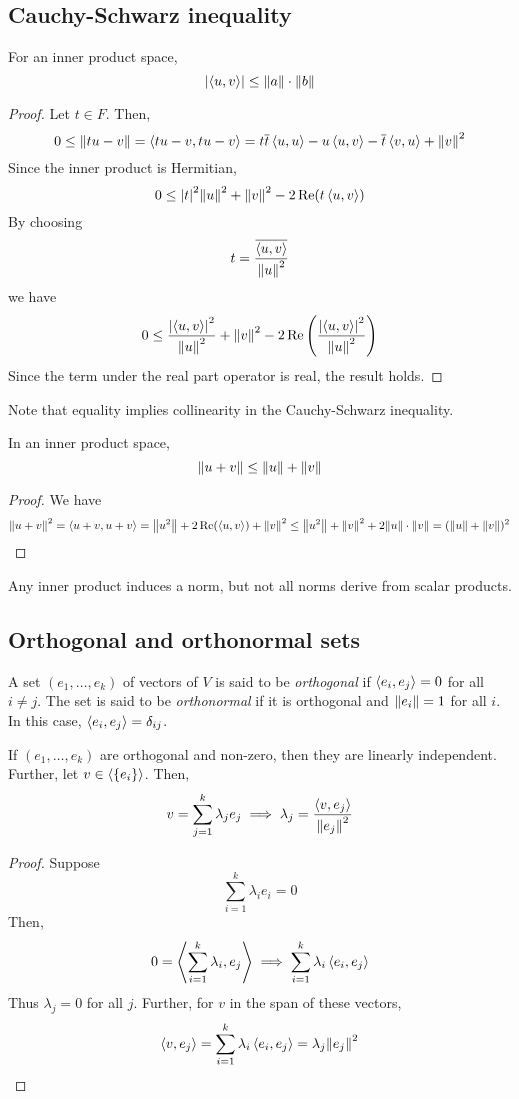 \subsection{Cauchy-Schwarz inequality}
\begin{lemma}
	For an inner product space,
	\[
		\abs{\left\langle{u,v}\right\rangle} \leq \norm{a} \cdot \norm{b}
	\]
\end{lemma}
\begin{proof}
	Let \( t \in F \).
	Then,
	\[
		0 \leq \norm{t u - v} = \left\langle{tu - v, tu - v}\right\rangle = t \overline t \left\langle{u,u}\right\rangle - u \left\langle{u,v}\right\rangle - \overline t \left\langle{v,u}\right\rangle + \norm{v}^2
	\]
	Since the inner product is Hermitian,
	\[
		0 \leq \abs{t}^2 \norm{u}^2 + \norm{v}^2 - 2 \Re(t \left\langle{u,v}\right\rangle)
	\]
	By choosing
	\[
		t = \frac{\overline{\left\langle{u,v}\right\rangle}}{\norm{u}^2}
	\]
	we have
	\[
		0 \leq \frac{\abs{\left\langle{u,v}\right\rangle}^2}{\norm{u}^2} + \norm{v}^2 - 2 \Re\qty(\frac{\abs{\left\langle{u,v}\right\rangle}^2}{\norm{u}^2})
	\]
	Since the term under the real part operator is real, the result holds.
\end{proof}
\noindent Note that equality implies collinearity in the Cauchy-Schwarz inequality.
\begin{corollary}
	In an inner product space,
	\[
		\norm{u+v} \leq \norm{u} + \norm{v}
	\]
\end{corollary}
\begin{proof}
	We have
	\[
		\norm{u+v}^2 = \left\langle{u+v, u+v}\right\rangle = \norm{u^2} + 2 \Re(\left\langle{u,v}\right\rangle) + \norm{v}^2 \leq \norm{u^2} + \norm{v}^2 + 2 \norm{u} \cdot \norm{v} = (\norm{u} + \norm{v})^2
	\]
\end{proof}
\begin{remark}
	Any inner product induces a norm, but not all norms derive from scalar products.
\end{remark}

\subsection{Orthogonal and orthonormal sets}
\begin{definition}
	A set \( (e_1, \dots, e_k) \) of vectors of \( V \) is said to be \textit{orthogonal} if \( \left\langle{e_i, e_j}\right\rangle = 0 \) for all \( i \neq j \).
	The set is said to be \textit{orthonormal} if it is orthogonal and \( \norm{e_i} = 1 \) for all \( i \).
	In this case, \( \left\langle{e_i, e_j}\right\rangle = \delta_{ij} \).
\end{definition}
\begin{lemma}
	If \( (e_1, \dots, e_k) \) are orthogonal and non-zero, then they are linearly independent.
	Further, let \( v \in \langle{} \qty{e_i} \rangle \).
	Then,
	\[
		v = \sum_{j=1}^k \lambda_j e_j \implies \lambda_j = \frac{\left\langle{v, e_j}\right\rangle}{\norm{e_j}^2}
	\]
\end{lemma}
\begin{proof}
	Suppose
	\[
		\sum_{i=1}^k \lambda_i e_i = 0
	\]
	Then,
	\[
		0 = \left\langle{\sum_{i=1}^k \lambda_i, e_j}\right\rangle \implies \sum_{i=1}^k \lambda_i \left\langle{e_i, e_j}\right\rangle
	\]
	Thus \( \lambda_j = 0 \) for all \( j \).
	Further, for \( v \) in the span of these vectors,
	\[
		\left\langle{v, e_j}\right\rangle = \sum_{i=1}^k \lambda_i \left\langle{e_i, e_j}\right\rangle = \lambda_j \norm{e_j}^2
	\]
\end{proof}

